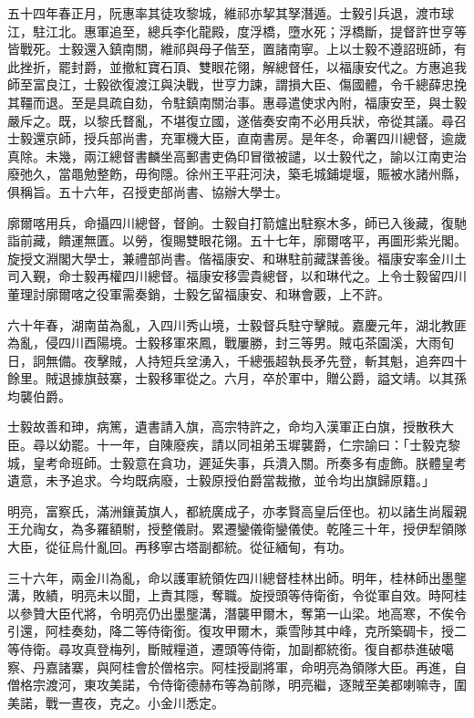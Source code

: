 \begin{pinyinscope}
五十四年春正月，阮惠率其徒攻黎城，維祁亦挈其孥潛遁。士毅引兵退，渡市球江，駐江北。惠軍追至，總兵李化龍殿，度浮橋，墮水死；浮橋斷，提督許世亨等皆戰死。士毅還入鎮南關，維祁與母子偕至，置諸南寧。上以士毅不遵詔班師，有此挫折，罷封爵，並撤紅寶石頂、雙眼花翎，解總督任，以福康安代之。方惠追我師至富良江，士毅欲復渡江與決戰，世亨力諫，謂損大臣、傷國體，令千總薛忠挽其韁而退。至是具疏自劾，令駐鎮南關治事。惠尋遣使求內附，福康安至，與士毅嚴斥之。既，以黎氏瞀亂，不堪復立國，遂偕奏安南不必用兵狀，帝從其議。尋召士毅還京師，授兵部尚書，充軍機大臣，直南書房。是年冬，命署四川總督，逾歲真除。未幾，兩江總督書麟坐高郵書吏偽印冒徵被譴，以士毅代之，諭以江南吏治廢弛久，當黽勉整飭，毋徇隱。徐州王平莊河決，築毛城鋪堤堰，賑被水諸州縣，俱稱旨。五十六年，召授吏部尚書、協辦大學士。

廓爾喀用兵，命攝四川總督，督餉。士毅自打箭爐出駐察木多，師已入後藏，復馳詣前藏，饋運無匱。以勞，復賜雙眼花翎。五十七年，廓爾喀平，再圖形紫光閣。旋授文淵閣大學士，兼禮部尚書。偕福康安、和琳駐前藏謀善後。福康安率金川土司入覲，命士毅再權四川總督。福康安移雲貴總督，以和琳代之。上令士毅留四川董理討廓爾喀之役軍需奏銷，士毅乞留福康安、和琳會覈，上不許。

六十年春，湖南苗為亂，入四川秀山境，士毅督兵駐守擊賊。嘉慶元年，湖北教匪為亂，侵四川酉陽境。士毅移軍來鳳，戰屢勝，封三等男。賊屯茶園溪，大雨旬日，詗無備。夜擊賊，人持短兵坌湧入，千總張超執長矛先登，斬其魁，追奔四十餘里。賊退據旗鼓寨，士毅移軍從之。六月，卒於軍中，贈公爵，謚文靖。以其孫均襲伯爵。

士毅故善和珅，病篤，遺書請入旗，高宗特許之，命均入漢軍正白旗，授散秩大臣。尋以幼罷。十一年，自陳廢疾，請以同祖弟玉墀襲爵，仁宗諭曰：「士毅克黎城，皇考命班師。士毅意在貪功，遲延失事，兵潰入關。所奏多有虛飾。朕體皇考遺意，未予追求。今均既病廢，士毅原授伯爵當裁撤，並令均出旗歸原籍。」

明亮，富察氏，滿洲鑲黃旗人，都統廣成子，亦孝賢高皇后侄也。初以諸生尚履親王允祹女，為多羅額駙，授整儀尉。累遷鑾儀衛鑾儀使。乾隆三十年，授伊犁領隊大臣，從征烏什亂回。再移寧古塔副都統。從征緬甸，有功。

三十六年，兩金川為亂，命以護軍統領佐四川總督桂林出師。明年，桂林師出墨壟溝，敗績，明亮未以聞，上責其隱，奪職。旋授頭等侍衛銜，令從軍自效。時阿桂以參贊大臣代將，令明亮仍出墨壟溝，潛襲甲爾木，奪第一山梁。地高寒，不俟令引還，阿桂奏劾，降二等侍衛銜。復攻甲爾木，乘雪陟其中峰，克所築碉卡，授二等侍衛。尋攻真登梅列，斷賊糧道，遷頭等侍衛，加副都統銜。復自都恭進破噶察、丹嘉諸寨，與阿桂會於僧格宗。阿桂授副將軍，命明亮為領隊大臣。再進，自僧格宗渡河，東攻美諾，令侍衛德赫布等為前隊，明亮繼，逐賊至美都喇嘛寺，圍美諾，戰一晝夜，克之。小金川悉定。


\end{pinyinscope}
